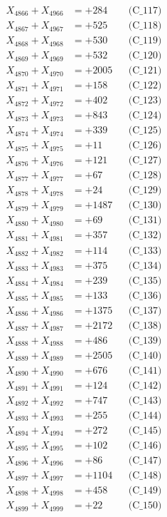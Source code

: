 \documentclass[a4paper,10pt]{article}
\begin{document}
{\begin{align}
X_{4866} + X_{4966} &= +284 && \text{(C\_117)} \\
X_{4867} + X_{4967} &= +525 && \text{(C\_118)} \\
X_{4868} + X_{4968} &= +530 && \text{(C\_119)} \\
X_{4869} + X_{4969} &= +532 && \text{(C\_120)} \\
\allowbreak
X_{4870} + X_{4970} &= +2005 && \text{(C\_121)} \\
X_{4871} + X_{4971} &= +158 && \text{(C\_122)} \\
X_{4872} + X_{4972} &= +402 && \text{(C\_123)} \\
X_{4873} + X_{4973} &= +843 && \text{(C\_124)} \\
X_{4874} + X_{4974} &= +339 && \text{(C\_125)} \\
\allowbreak
X_{4875} + X_{4975} &= +11 && \text{(C\_126)} \\
X_{4876} + X_{4976} &= +121 && \text{(C\_127)} \\
X_{4877} + X_{4977} &= +67 && \text{(C\_128)} \\
X_{4878} + X_{4978} &= +24 && \text{(C\_129)} \\
X_{4879} + X_{4979} &= +1487 && \text{(C\_130)} \\
\allowbreak
X_{4880} + X_{4980} &= +69 && \text{(C\_131)} \\
X_{4881} + X_{4981} &= +357 && \text{(C\_132)} \\
X_{4882} + X_{4982} &= +114 && \text{(C\_133)} \\
X_{4883} + X_{4983} &= +375 && \text{(C\_134)} \\
X_{4884} + X_{4984} &= +239 && \text{(C\_135)} \\
\allowbreak
X_{4885} + X_{4985} &= +133 && \text{(C\_136)} \\
X_{4886} + X_{4986} &= +1375 && \text{(C\_137)} \\
X_{4887} + X_{4987} &= +2172 && \text{(C\_138)} \\
X_{4888} + X_{4988} &= +486 && \text{(C\_139)} \\
X_{4889} + X_{4989} &= +2505 && \text{(C\_140)} \\
\allowbreak
X_{4890} + X_{4990} &= +676 && \text{(C\_141)} \\
X_{4891} + X_{4991} &= +124 && \text{(C\_142)} \\
X_{4892} + X_{4992} &= +747 && \text{(C\_143)} \\
X_{4893} + X_{4993} &= +255 && \text{(C\_144)} \\
X_{4894} + X_{4994} &= +272 && \text{(C\_145)} \\
\allowbreak
X_{4895} + X_{4995} &= +102 && \text{(C\_146)} \\
X_{4896} + X_{4996} &= +86 && \text{(C\_147)} \\
X_{4897} + X_{4997} &= +1104 && \text{(C\_148)} \\
X_{4898} + X_{4998} &= +458 && \text{(C\_149)} \\
X_{4899} + X_{4999} &= +22 && \text{(C\_150)} \\
\end{align}
}
\end{document}
